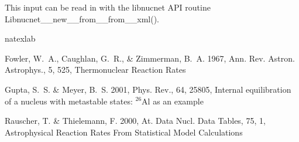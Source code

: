 \documentclass{article}    %
\def\prc{Phys. Rev.}
\def\araa{Ann. Rev. Astron. Astrophys.}
\begin{document}
This input can be read in with the libnucnet API routine
Libnucnet\_\_new\_\_from\_\_from\_\_xml().

\begin{thebibliography}{3}
\expandafter\ifx\csname natexlab\endcsname\relax\def\natexlab#1{#1}\fi

{Fowler}, W.~A., {Caughlan}, G.~R., \& {Zimmerman}, B.~A. 1967, \araa, 5, 525,
  {Thermonuclear Reaction Rates}

{Gupta}, S.~S. \& {Meyer}, B.~S. 2001, \prc, 64, 25805, {Internal equilibration
  of a nucleus with metastable states: $^{26}$Al as an example}

{Rauscher}, T. \& {Thielemann}, F. 2000, At. Data Nucl. Data Tables, 75, 1,
  {Astrophysical Reaction Rates From Statistical Model Calculations}

\end{thebibliography}
\end{document}

